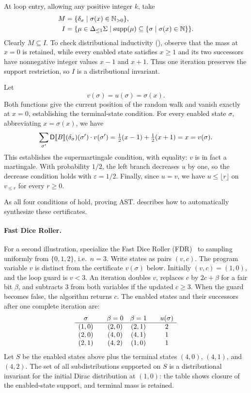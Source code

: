 At loop entry, allowing any positive integer $k$, take
\[
 \begin{aligned}
 M&=\{\delta_{\sigma}\mid\sigma(x)\in\mathbb N_{>0}\},\\
 I&=\{\mu\in{\Delta_{\leq 1}\Sigma}\mid
       \textnormal{supp}(\mu)\subseteq\{\sigma\mid\sigma(x)\in\mathbb N\}\}.
 \end{aligned}
\]
Clearly $M\subseteq I$. To check distributional inductivity
(), observe that the mass at $x=0$
is retained, while every enabled state satisfies $x\geq1$ and its two
successors have nonnegative integer values $x-1$ and $x+1$.
Thus one iteration preserves the support restriction, so $I$ is a
distributional invariant.

Let
\[
 v(\sigma)=u(\sigma)=\sigma(x).
\]
Both functions give the current position of the random walk and vanish
exactly at $x=0$, establishing the terminal-state condition.
For every enabled state $\sigma$, abbreviating $x=\sigma(x)$, we have
\[
 \sum_{\sigma'}\mathsf{D}\llbracket B\rrbracket(\delta_{\sigma})(\sigma')\cdot v(\sigma')
 =\tfrac12(x-1)+\tfrac12(x+1)=x=v(\sigma).
\]
This establishes the supermartingale condition, with equality: $v$ is
in fact a martingale. With probability $1/2$, the left branch decreases
$u$ by one, so the decrease condition holds with $\varepsilon=1/2$.
Finally, since $u=v$, we have $u\leq\lfloor r\rfloor$ on $v_{\leq r}$ for every $r \geq 0$.

As all four conditions of  hold, proving AST.
 describes how to automatically synthesize these certificates.

\paragraph{Fast Dice Roller.}
For a second illustration, specialize the Fast Dice Roller
(FDR)~\cite{DBLP:journals/corr/abs-1304-1916} to sampling uniformly from
$\{0,1,2\}$, i.e.\ $n=3$.
Write states as pairs $(v,c)$.
The program variable $v$ is distinct from the certificate $v(\sigma)$ below.
Initially $(v,c)=(1,0)$, and the loop guard is $v<3$.
An iteration doubles $v$, replaces $c$ by $2c+\beta$ for a fair bit
$\beta$, and subtracts $3$ from both variables if the updated $c\geq3$.
When the guard becomes false, the algorithm returns $c$.
The enabled states and their successors after one complete iteration are:
\[
 \begin{array}{c@{\qquad}c@{\quad}c@{\qquad}c}
 \sigma & \beta=0 & \beta=1 & u(\sigma)\\ \hline
 (1,0) & (2,0) & (2,1) & 2\\
 (2,0) & (4,0) & (4,1) & 1\\
 (2,1) & (4,2) & (1,0) & 1
 \end{array}
\]
Let $S$ be the enabled states above plus the terminal states
$(4,0)$, $(4,1)$, and $(4,2)$.
The set of all subdistributions supported on $S$ is a distributional
invariant for the initial Dirac distribution at $(1,0)$:
the table shows closure of the enabled-state support, and terminal
mass is retained.

